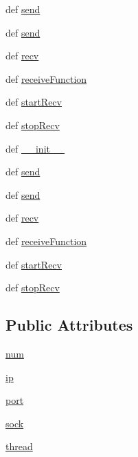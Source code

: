 \begin{DoxyCompactItemize}
def \hyperlink{classnetwork_1_1commsChannel_1_1UDPChannel_a7aeb7a38b3072fab11df4881fb22dd67}{send}
\item 
def \hyperlink{classnetwork_1_1commsChannel_1_1UDPChannel_a7aeb7a38b3072fab11df4881fb22dd67}{send}
\item 
def \hyperlink{classnetwork_1_1commsChannel_1_1UDPChannel_aeeda07b7e78ec0750501ca40d114aadc}{recv}
\item 
def \hyperlink{classnetwork_1_1commsChannel_1_1UDPChannel_a0e4df6f6b2e9030f6b58a945ab15e71d}{receive\+Function}
\item 
def \hyperlink{classnetwork_1_1commsChannel_1_1UDPChannel_a1a31b8bce874232ee25a022fe8a358dc}{start\+Recv}
\item 
def \hyperlink{classnetwork_1_1commsChannel_1_1UDPChannel_aa3eb1e0f39dbf4a9fed075600b104772}{stop\+Recv}
\item 
def \hyperlink{classnetwork_1_1commsChannel_1_1UDPChannel_ae3e90f5c66765ae3f5d97334bb9767ad}{\+\_\+\+\_\+init\+\_\+\+\_\+}
\item 
def \hyperlink{classnetwork_1_1commsChannel_1_1UDPChannel_a7aeb7a38b3072fab11df4881fb22dd67}{send}
\item 
def \hyperlink{classnetwork_1_1commsChannel_1_1UDPChannel_a7aeb7a38b3072fab11df4881fb22dd67}{send}
\item 
def \hyperlink{classnetwork_1_1commsChannel_1_1UDPChannel_aeeda07b7e78ec0750501ca40d114aadc}{recv}
\item 
def \hyperlink{classnetwork_1_1commsChannel_1_1UDPChannel_a0e4df6f6b2e9030f6b58a945ab15e71d}{receive\+Function}
\item 
def \hyperlink{classnetwork_1_1commsChannel_1_1UDPChannel_a1a31b8bce874232ee25a022fe8a358dc}{start\+Recv}
\item 
def \hyperlink{classnetwork_1_1commsChannel_1_1UDPChannel_aa3eb1e0f39dbf4a9fed075600b104772}{stop\+Recv}
\end{DoxyCompactItemize}
\subsection*{Public Attributes}
\begin{DoxyCompactItemize}
\item 
\hyperlink{classnetwork_1_1commsChannel_1_1UDPChannel_af43851623627900a93360187e7a4b5a0}{num}
\item 
\hyperlink{classnetwork_1_1commsChannel_1_1UDPChannel_a13939ef9b0ba434e2bb786d19f450b48}{ip}
\item 
\hyperlink{classnetwork_1_1commsChannel_1_1UDPChannel_a6b1a61243c41a625092986e6b38959e9}{port}
\item 
\hyperlink{classnetwork_1_1commsChannel_1_1UDPChannel_a19e4c1af17dc22d1c378ac53280fe679}{sock}
\item 
\hyperlink{classnetwork_1_1commsChannel_1_1UDPChannel_a8def8c5020988707811a671264d3b8b7}{thread}
\end{DoxyCompactItemize}
